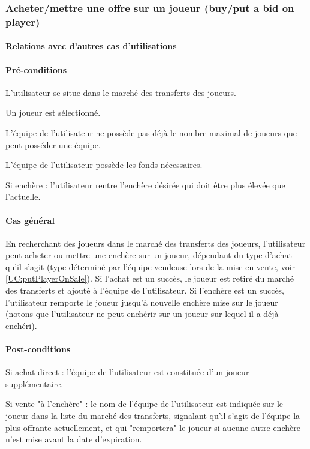 \subsubsection{Acheter/mettre une offre sur un joueur (buy/put a bid on player)}
\label{UC:buyPlayer}
\paragraph{Relations avec d'autres cas d'utilisations}
\paragraph{Pré-conditions}
\begin{list}{}{\leftmargin=1.5em}
\item{L'utilisateur se situe dans le marché des transferts des joueurs.}
\item{Un joueur est sélectionné.}
\item{L'équipe de l'utilisateur ne possède pas déjà le nombre maximal de joueurs que peut posséder une équipe.}
\item{L'équipe de l'utilisateur possède les fonds nécessaires.}
\item{Si enchère : l'utilisateur rentre l'enchère désirée qui doit être plus élevée que l'actuelle.}
\end{list}
\paragraph{Cas général}
En recherchant des joueurs dans le marché des transferts des joueurs, l'utilisateur peut acheter ou mettre une enchère sur un joueur, dépendant du type d'achat qu'il s'agit (type déterminé par l'équipe vendeuse lors de la mise en vente, voir \ref{UC:putPlayerOnSale}). Si l'achat est un succès, le joueur est retiré du marché des transferts et ajouté à l'équipe de l'utilisateur. Si l'enchère est un succès, l'utilisateur remporte le joueur jusqu'à nouvelle enchère mise sur le joueur (notons que l'utilisateur ne peut enchérir sur un joueur sur lequel il a déjà enchéri). 
\paragraph{Post-conditions}
\begin{list}{}{\leftmargin=1.5em}
\item{Si achat direct : l'équipe de l'utilisateur est constituée d'un joueur supplémentaire.}
\item{Si vente "à l'enchère" : le nom de l'équipe de l'utilisateur est indiquée sur le joueur dans la liste du marché des transferts, signalant qu'il s'agit de l'équipe la plus offrante actuellement, et qui "remportera" le joueur si aucune autre enchère n'est mise avant la date d'expiration.}
\end{list}

